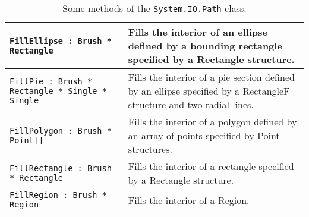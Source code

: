 \begin{table}
\begin{center}
\begin{tabularx}{\linewidth}{|l|X|}
      \hline
      \lstinline{FillEllipse : Brush * Rectangle}	
      &Fills the interior of an ellipse defined by a bounding rectangle specified by a Rectangle structure.\\
      \hline
      \lstinline{FillPie : Brush * Rectangle * Single * Single}	
      &Fills the interior of a pie section defined by an ellipse specified by a RectangleF structure and two radial lines.\\
      \hline
      \lstinline{FillPolygon : Brush * Point[]}	
      &Fills the interior of a polygon defined by an array of points specified by Point structures.\\
      \hline
      \lstinline{FillRectangle : Brush * Rectangle}	
      &Fills the interior of a rectangle specified by a Rectangle structure.\\
      \hline
      \lstinline{FillRegion : Brush * Region}	
      &Fills the interior of a Region.\\
      \hline
    \end{tabularx}
  \end{center}
  \caption{Some methods of the \lstinline!System.IO.Path! class.}
  \label{tab:path}
\end{table}

